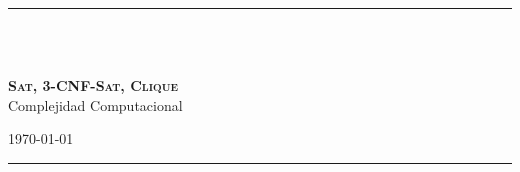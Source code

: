 \fancyhead[C]{}
\hrule \medskip
\begin{minipage}{0.295\textwidth} 
\raggedright
\footnotesize
\yourname \hfill\\ 
\partnername \hfill \\
\end{minipage}
\begin{minipage}{0.4\textwidth} 
\centering 
\large 
\textbf{\textsc{Sat, 3-CNF-Sat}, \textsc{Clique}}\\ 
\normalsize 
Complejidad Computacional\\ 
\end{minipage}
\begin{minipage}{0.295\textwidth} 
\raggedleft
\today\hfill\\
\end{minipage}
\medskip\hrule 
\bigskip

